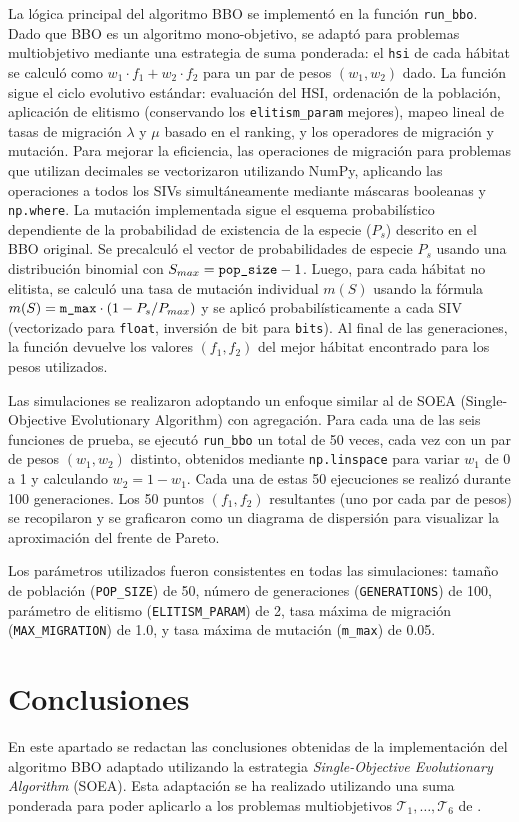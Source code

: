 \documentclass{article}
\begin{document}
La lógica principal del algoritmo BBO se implementó en la función \verb|run_bbo|. Dado que BBO es un algoritmo mono-objetivo, se adaptó para problemas multiobjetivo mediante una estrategia de suma ponderada: el \verb|hsi| de cada hábitat se calculó como $w_1 \cdot f_1 + w_2 \cdot f_2$ para un par de pesos $(w_1, w_2)$ dado. La función sigue el ciclo evolutivo estándar: evaluación del HSI, ordenación de la población, aplicación de elitismo (conservando los \verb|elitism_param| mejores), mapeo lineal de tasas de migración $\lambda$ y $\mu$ basado en el ranking, y los operadores de migración y mutación. Para mejorar la eficiencia, las operaciones de migración para problemas que utilizan decimales se vectorizaron utilizando NumPy, aplicando las operaciones a todos los SIVs simultáneamente mediante máscaras booleanas y \verb|np.where|. La mutación implementada sigue el esquema probabilístico dependiente de la probabilidad de existencia de la especie ($P_s$) descrito en el BBO original. Se precalculó el vector de probabilidades de especie $P_s$ usando una distribución binomial con $S_{max} = \verb|pop_size| - 1$. Luego, para cada hábitat no elitista, se calculó una tasa de mutación individual $m(S)$ usando la fórmula $m(S) = \verb|m_max| \cdot (1 - P_s / P_{max})$ y se aplicó probabilísticamente a cada SIV (vectorizado para \verb|float|, inversión de bit para \verb|bits|). Al final de las generaciones, la función devuelve los valores $(f_1, f_2)$ del mejor hábitat encontrado para los pesos utilizados.

Las simulaciones se realizaron adoptando un enfoque similar al de SOEA (Single-Objective Evolutionary Algorithm) con agregación. Para cada una de las seis funciones de prueba, se ejecutó \verb|run_bbo| un total de 50 veces, cada vez con un par de pesos $(w_1, w_2)$ distinto, obtenidos mediante \verb|np.linspace| para variar $w_1$ de 0 a 1 y calculando $w_2 = 1 - w_1$. Cada una de estas 50 ejecuciones se realizó durante 100 generaciones. Los 50 puntos $(f_1, f_2)$ resultantes (uno por cada par de pesos) se recopilaron y se graficaron como un diagrama de dispersión para visualizar la aproximación del frente de Pareto.

Los parámetros utilizados fueron consistentes en todas las simulaciones: tamaño de población (\verb|POP_SIZE|) de 50, número de generaciones (\verb|GENERATIONS|) de 100, parámetro de elitismo (\verb|ELITISM_PARAM|) de 2, tasa máxima de migración (\verb|MAX_MIGRATION|) de 1.0, y tasa máxima de mutación (\verb|m_max|) de 0.05.


\section{Conclusiones}
\label{sec:meta2_Conclusiones}
En este apartado se redactan las conclusiones obtenidas de la implementación del algoritmo BBO adaptado utilizando la estrategia \textit{Single-Objective Evolutionary Algorithm} (SOEA). Esta adaptación se ha realizado utilizando una suma ponderada para poder aplicarlo a los problemas multiobjetivos $\mathcal{T}_1, \ldots, \mathcal{T}_6$ de .
\end{document}
